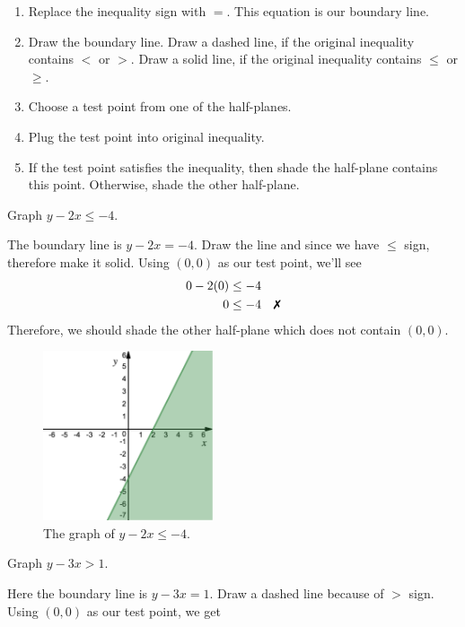 	\begin{tcolorbox}[title=Graphing a linear inequality, 
	                  fonttitle=\bfseries,
	                  colframe=blue!70!red,
	                  colback=white]
	\begin{enumerate}
	    \item Replace the inequality sign with $=$. This equation is our boundary line.
    	\item Draw the boundary line. Draw a dashed line, if the original inequality contains $<$ or $>$. Draw a solid line, if the original inequality contains $\leq$ or $\geq$.
	    \item Choose a test point from one of the half-planes.
    	\item Plug the test point into original inequality.
    	\item If the test point satisfies the inequality, then shade the half-plane contains this point. Otherwise, shade the other half-plane.
	\end{enumerate}
	\end{tcolorbox}
\begin{example}
	 Graph  $y-2x\leq -4$.
\end{example}
%
The boundary line is $y-2x=-4$. Draw the line and since we have $\leq$ sign, therefore make it
solid. Using $(0,0)$ as our test point, we'll see
\begin{align*}
	0-2(0) &\leq -4 \\
	0 &\leq -4 \quad \xmark
\end{align*}
Therefore, we should shade the other half-plane which does not contain $(0,0)$.
%
\begin{figure}[H]
 \includegraphics[width=5cm]{pics/pic1.png}
 \centering
  \caption{The graph of $y-2x\leq -4$.}
\end{figure}
\begin{example}
	Graph $y-3x > 1$.
\end{example}
%
Here the boundary line is $y-3x=1$. Draw a dashed line because of $>$ sign. Using $(0,0)$ as our test point, we get
